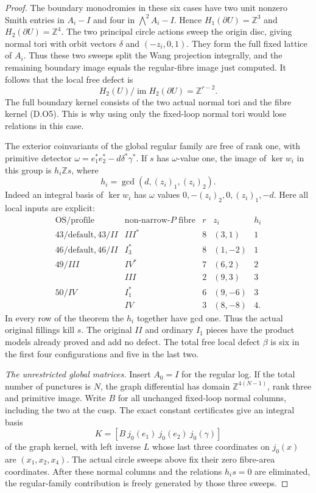\begin{proof}
The boundary monodromies in these six cases have two
unit nonzero Smith entries in $A_i-I$ and four in
$\bigwedge^2A_i-I$. Hence $H_1(\partial U)=\mathbb Z^3$
and $H_2(\partial U)=\mathbb Z^4$.
The two principal circle actions sweep the origin
disc, giving normal tori with orbit vectors
$\delta$ and $(-z_i,0,1)$. They form the full fixed
lattice of $A_i$. Thus these two sweeps split the
Wang projection integrally, and the remaining
boundary image equals the regular-fibre image just
computed. It follows that the local free defect is
\[
                H_2(U)/\operatorname{im}H_2(\partial U)
                         =\mathbb Z^{r-2}.
 \tag{D.O6}
\]
The full boundary kernel consists of the two actual
normal tori and the fibre kernel (D.O5). This is why
using only the fixed-loop normal tori would lose
relations in this case.

The exterior coinvariants of the global regular family
are free of rank one, with primitive detector
$\omega=e_1^*e_2^*-d\delta^*\gamma^*$.
If $s$ has $\omega$-value one, the image of $\ker w_i$
in this group is $h_i\mathbb Zs$, where
\[
                  h_i=\gcd(d,(z_i)_1,(z_i)_2).
\]
Indeed an integral basis of $\ker w_i$ has $\omega$
values $0,-(z_i)_2,0,(z_i)_1,-d$.
Here all local inputs are explicit:
\[
\begin{array}{c|c|r|r|r}
 \mathrm{OS/profile}&\text{non-narrow-}P\text{ fibre}
       &r&z_i&h_i\\\hline
 43/\mathrm{default},43/II&III^*&8&(3,1)&1\\
 46/\mathrm{default},46/II&I_3^*&8&(1,-2)&1\\
 49/III&IV^*&7&(6,2)&2\\
       &III&2&(9,3)&3\\
 50/IV&I_1^*&6&(9,-6)&3\\
      &IV&3&(8,-8)&4.
\end{array}
\tag{D.O7}
\]
In every row of the theorem the $h_i$ together have gcd
one. Thus the actual original fillings kill $s$.
The original $II$ and ordinary $I_1$ pieces have the
product models already proved and add no defect.
The total free local defect $\beta$ is six in the first
four configurations and five in the last two.

\emph{The unrestricted global matrices.}
Insert $A_0=I$ for the regular log. If the total number
of punctures is $N$, the graph differential has domain
$\mathbb Z^{4(N-1)}$, rank three and primitive image.
Write $B$ for all unchanged fixed-loop normal columns,
including the two at the cusp. The exact constant
certificates give an integral basis
\[
 K=[B\ j_0(e_1)\ j_0(e_2)\ j_0(\gamma)]
\]
of the graph kernel, with left inverse $L$ whose last
three coordinates on $j_0(x)$ are $(x_1,x_2,x_4)$.
The actual circle sweeps above fix their zero fibre-area
coordinates. After these normal columns and the relations
$h_is=0$ are eliminated, the regular-family contribution
is freely generated by those three sweeps.


\end{proof}
